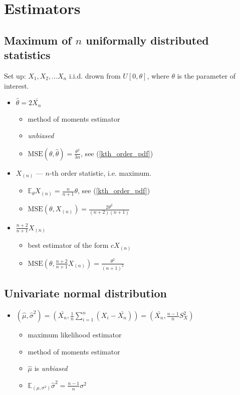 \documentclass[12pt]{article}
\theoremstyle{definition}
\theoremstyle{remark}
\numberwithin{equation}{section}
\begin{document}
\section{Estimators}

\subsection{Maximum of $n$ uniformally distributed statistics}

Set up: $X_1, X_2,\ldots X_n$ i.i.d. drown from $U[0, \theta]$, where $\theta$ is the parameter of interest.

\begin{itemize}
	\item $\hat\theta = 2\bar{X_n}$
	\begin{itemize}
		\item method of moments estimator
		\item \emph{unbiased}
		\item $\text{MSE}(\theta, \hat\theta) = \frac {\theta^2}{3n}$, see (\ref{kth_order_pdf})
	\end{itemize}
	\item $X_{(n)}$ --- $n$-th order statistic, i.e. maximum.
	\begin{itemize}
		\item $\mathbb{E}_\theta X_{(n)} = \frac{n}{n+1}\theta$, see (\ref{kth_order_pdf})
		\item $\text{MSE}(\theta, X_{(n)}) = \frac {2\theta^2}{(n+2)(n+1)}$
	\end{itemize}
	\item $\frac{n+2}{n+1}X_{(n)}$
	\begin{itemize}
		\item best estimator of the form $cX_{(n)}$
		\item $\text{MSE}(\theta, \frac{n+2}{n+1}X_{(n)}) = \frac {\theta^2}{(n+1)^2}$
	\end{itemize}
\end{itemize}

\subsection{Univariate normal distribution}

\begin{itemize}
	\item $\displaystyle{(\hat\mu, \hat{\sigma}^2) = \left(\bar{X_n}, \frac 1 n \sum_{i=1}^n (X_i - \bar{X_n}) \right) = \left(\bar{X_n}, \frac {n-1} n S_X^2 \right)}$
	\begin{itemize}
		\item maximum likelihood estimator
		\item method of moments estimator
		\item $\hat\mu$ is \emph{unbiased}
		\item $\mathbb{E}_{(\mu,\sigma^2)}\hat{\sigma}^2 = \frac {n-1} n \sigma^2$

	\end{itemize}

\end{itemize}
\end{document}
